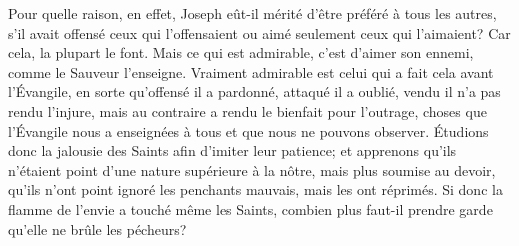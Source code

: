 Pour quelle raison, en effet,
		Joseph eût-il mérité d’être préféré à tous les autres,
	s’il avait offensé ceux qui l’offensaient
	ou aimé seulement ceux qui l’aimaient?
	Car cela, la plupart le font.
Mais ce qui est admirable, c’est d’aimer son ennemi,
	comme le Sauveur l’enseigne.
Vraiment admirable est celui qui a fait cela avant l’Évangile,
	en sorte qu’offensé il a pardonné,
	attaqué il a oublié,
	vendu il n’a pas rendu l’injure,
	mais au contraire a rendu le bienfait pour l’outrage,
	choses que l’Évangile nous a enseignées à tous
	et que nous ne pouvons observer.
Étudions donc la jalousie des Saints afin d’imiter leur patience;
	et apprenons qu’ils n’étaient point d’une nature supérieure à la nôtre,
	mais plus soumise au devoir,
	qu’ils n’ont point ignoré les penchants mauvais,
	mais les ont réprimés.
Si donc la flamme de l’envie a touché même les Saints,
	combien plus faut-il prendre garde qu’elle ne brûle les pécheurs?

